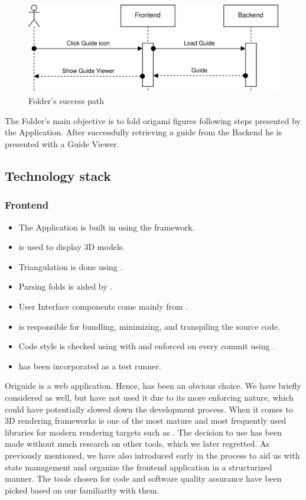 \begin{figure}[H]
	\caption{Folder's success path}
  \centering
    \includegraphics[width=\textwidth]{assets/3-folder-flow.png}
\end{figure}

The Folder's main objective is to fold origami figures following steps presented by the Application. After successfully retrieving a guide from the Backend he is presented with a Guide Viewer.

\subsection{Technology stack}

\subsubsection{Frontend}

\begin{itemize}
	\item The Application is built in  using the  framework. 
	\item {} is used to display 3D models.
	\item Triangulation is done using . 
	\item Parsing folds is aided by .
	\item User Interface components come mainly from .
	\item {} is responsible for bundling, minimizing, and transpiling the source code.
	\item Code style is checked using  with  and enforced on every commit using .
	\item {} has been incorporated as a test runner.
\end{itemize}

Origuide is a web application. Hence,  has been an obvious choice. We have briefly considered  as well, but have not used it due to its more enforcing nature, which could have potentially slowed down the development process. When it comes to 3D rendering frameworks  is one of the most mature and most frequently used libraries for modern rendering targets such as . The decision to use  has been made without much research on other tools, which we later regretted. As previously mentioned, we have also introduced  early in the process to aid us with state management and organize the frontend application in a structurized manner. The tools chosen for code and software quality assurance have been picked based on our familiarity with them.


